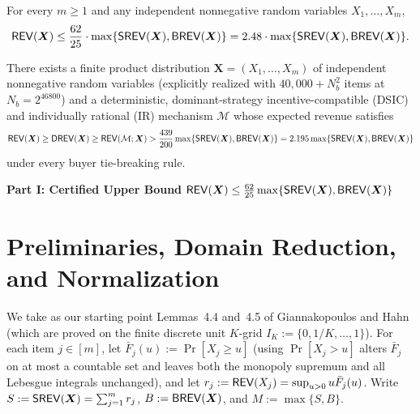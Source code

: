 \begin{theorem}\label{thm:ub-main}
For every $m \ge 1$ and any independent nonnegative random variables $X_1,\dots,X_m$,
\[
  \mathsf{REV}(\bm{X}) \le \frac{62}{25} \cdot \max\{\mathsf{SREV}(\bm{X}), \mathsf{BREV}(\bm{X})\} = 2.48 \cdot \max\{\mathsf{SREV}(\bm{X}), \mathsf{BREV}(\bm{X})\}.
\]
\end{theorem}

\begin{theorem}\label{thm:lb-main}
There exists a finite product distribution $\bm{X} = (X_1,\dots,X_m)$ of independent nonnegative random variables (explicitly realized with $40{,}000 + N_b^2$ items at $N_b = 2^{46800}$) and a deterministic, dominant-strategy incentive-compatible (DSIC) and individually rational (IR) mechanism $\mathcal{M}$ whose expected revenue satisfies
\[
  \mathsf{REV}(\bm{X}) \ge \mathsf{DREV}(\bm{X}) \ge \mathsf{REV}(\mathcal{M};\bm{X}) > \frac{439}{200} \max\{\mathsf{SREV}(\bm{X}), \mathsf{BREV}(\bm{X})\} = 2.195 \max\{\mathsf{SREV}(\bm{X}), \mathsf{BREV}(\bm{X})\}
\]
under every buyer tie-breaking rule.
\end{theorem}

\medskip
\noindent\textbf{Part I: Certified Upper Bound $\mathsf{REV}(\bm{X}) \le \frac{62}{25}\max\{\mathsf{SREV}(\bm{X}), \mathsf{BREV}(\bm{X})\}$}
\medskip

\section{Preliminaries, Domain Reduction, and Normalization}\label{sec:ub-prelim}

We take as our starting point Lemmas~4.4 and~4.5 of Giannakopoulos and Hahn~\cite{GiannakopoulosHahn26} (which are proved on the finite discrete unit $K$-grid $I_K := \{0, 1/K, \dots, 1\}$). For each item $j \in [m]$, let $\bar{F}_j(u) := \Pr[X_j \ge u]$ (using $\Pr[X_j > u]$ alters $\bar{F}_j$ on at most a countable set and leaves both the monopoly supremum and all Lebesgue integrals unchanged), and let $r_j := \mathsf{REV}(X_j) = \sup_{u > 0} u\bar{F}_j(u)$. Write $S := \mathsf{SREV}(\bm{X}) = \sum_{j=1}^m r_j$, $B := \mathsf{BREV}(\bm{X})$, and $M := \max\{S, B\}$.

